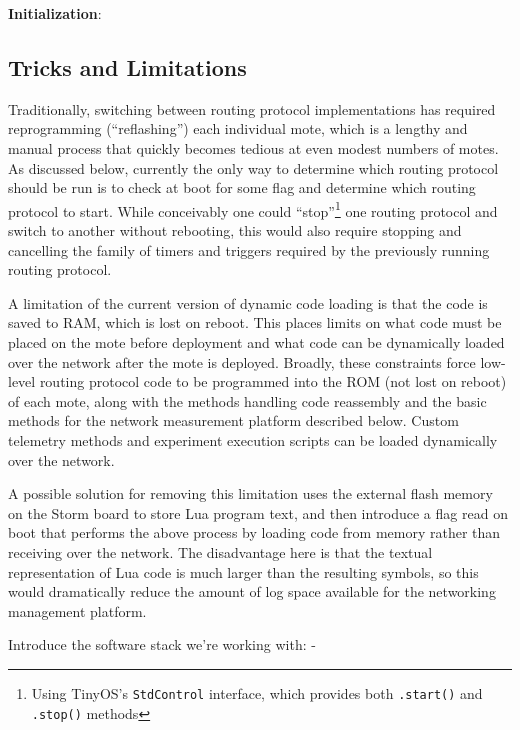 \textbf{Initialization}:

\subsection{Tricks and Limitations}

Traditionally, switching between routing protocol implementations has required reprogramming (``reflashing'') each individual mote, which is a lengthy and manual process that quickly becomes tedious at even modest numbers of motes.
As discussed below, currently the only way to determine which routing protocol should be run is to check at boot for some flag and determine which routing protocol to start.
While conceivably one could ``stop''\footnote{Using TinyOS's \texttt{StdControl} interface, which provides both \texttt{.start()} and \texttt{.stop()} methods} one routing protocol and switch to another without rebooting, this would also require stopping and cancelling the family of timers and triggers required by the previously running routing protocol.

A limitation of the current version of dynamic code loading is that the code is saved to RAM, which is lost on reboot.
This places limits on what code must be placed on the mote before deployment and what code can be dynamically loaded over the network after the mote is deployed.
Broadly, these constraints force low-level routing protocol code to be programmed into the ROM (not lost on reboot) of each mote, along with the methods handling code reassembly and the basic methods for the network measurement platform described below.
Custom telemetry methods and experiment execution scripts can be loaded dynamically over the network.

A possible solution for removing this limitation uses the external flash memory on the Storm board to store Lua program text, and then introduce a flag read on boot that performs the above process by loading code from memory rather than receiving over the network.
The disadvantage here is that the textual representation of Lua code is much larger than the resulting symbols, so this would dramatically reduce the amount of log space available for the networking management platform.

Introduce the software stack we're working with:
-
\fi


